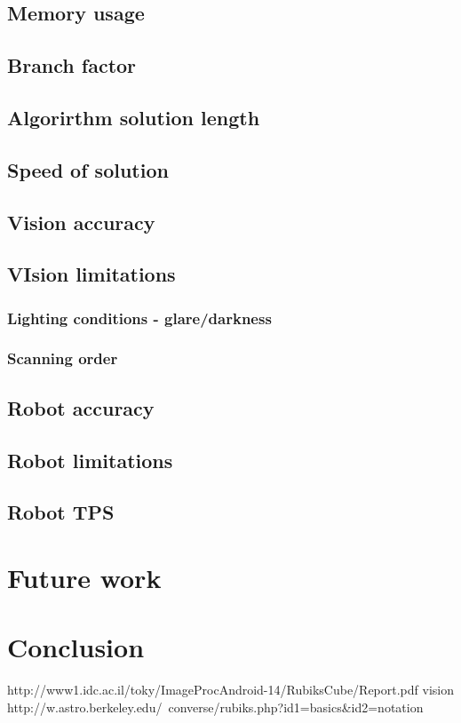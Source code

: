 \documentclass[titlepage]{report}[12pt]
\begin{document}
\subsection{Memory usage}
\subsection{Branch factor}
\subsection{Algorirthm solution length}
\subsection{Speed of solution}
\subsection{Vision accuracy}
\subsection{VIsion limitations}
\subsubsection{Lighting conditions - glare/darkness}
\subsubsection{Scanning order}
\subsection{Robot accuracy}
\subsection{Robot limitations}
\subsection{Robot TPS}

\section{Future work}
\section{Conclusion}




http://www1.idc.ac.il/toky/ImageProcAndroid-14/RubiksCube/Report.pdf   vision
http://w.astro.berkeley.edu/~converse/rubiks.php?id1=basics\&id2=notation
\end{document}
